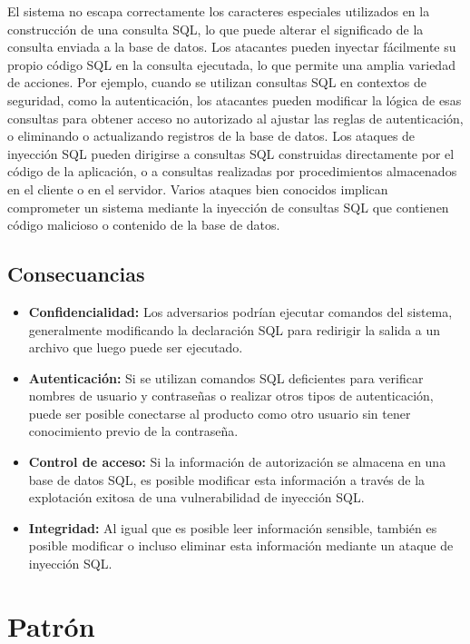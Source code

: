 El sistema no escapa correctamente los caracteres especiales utilizados en la construcción de una consulta SQL, lo que puede alterar el significado de la consulta enviada a la base de datos. Los atacantes pueden inyectar fácilmente su propio código SQL en la consulta ejecutada, lo que permite una amplia variedad de acciones. Por ejemplo, cuando se utilizan consultas SQL en contextos de seguridad, como la autenticación, los atacantes pueden modificar la lógica de esas consultas para obtener acceso no autorizado al ajustar las reglas de autenticación, o eliminando o actualizando registros de la base de datos. 
Los ataques de inyección SQL pueden dirigirse a consultas SQL construidas directamente por el código de la aplicación, o a consultas realizadas por procedimientos almacenados en el cliente o en el servidor. Varios ataques bien conocidos implican comprometer un sistema mediante la inyección de consultas SQL que contienen código malicioso o contenido de la base de datos. 

\subsection*{Consecuancias}

\begin{itemize}
    \item \textbf{Confidencialidad:} Los adversarios podrían ejecutar comandos del sistema, generalmente modificando la declaración SQL para redirigir la salida a un archivo que luego puede ser ejecutado.
    \item \textbf{Autenticación:} Si se utilizan comandos SQL deficientes para verificar nombres de usuario y contraseñas o realizar otros tipos de autenticación, puede ser posible conectarse al producto como otro usuario sin tener conocimiento previo de la contraseña.
    \item \textbf{Control de acceso:} Si la información de autorización se almacena en una base de datos SQL, es posible modificar esta información a través de la explotación exitosa de una vulnerabilidad de inyección SQL.
    \item \textbf{Integridad:} Al igual que es posible leer información sensible, también es posible modificar o incluso eliminar esta información mediante un ataque de inyección SQL.
\end{itemize}

\section{Patrón}

